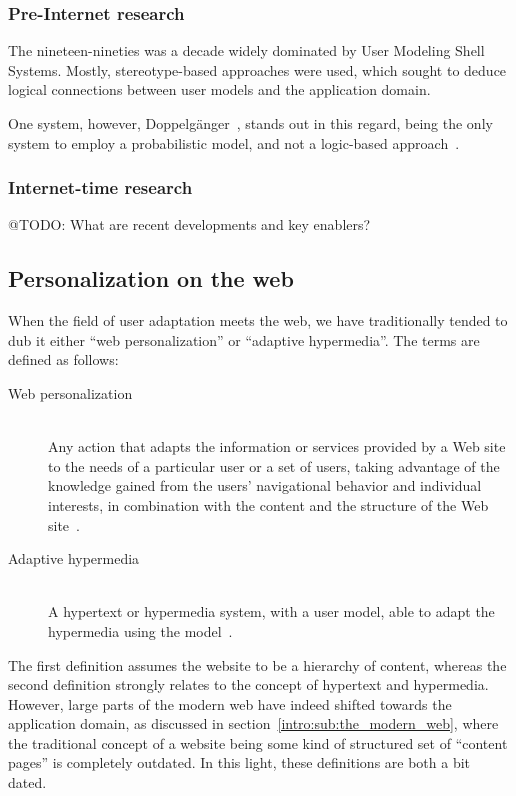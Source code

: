 \subsubsection{Pre-Internet research}

The nineteen-nineties was a decade widely dominated by User Modeling Shell Systems. Mostly, stereotype-based approaches were used, which sought to deduce logical connections between user models and the application domain.

One system, however, Doppelgänger~\cite{Orwant1995}, stands out in this regard, being the only system to employ a probabilistic model, and not a logic-based approach~\cite{Kobsa2001,Pohl1997,Pohl1999}.

\subsubsection{Internet-time research}

@TODO: What are recent developments and key enablers?

\subsection{Personalization on the web}
\label{survey:sub:web_personalization}

When the field of user adaptation meets the web, we have traditionally tended to dub it either ``web personalization'' or ``adaptive hypermedia''. The terms are defined as follows:

\begin{description}
    \item[Web personalization] \hfill \\
      Any action that adapts the information or services provided by a Web site to the needs of a particular user or a set of users, taking advantage of the knowledge gained from the users' navigational behavior and individual interests, in combination with the content and the structure of the Web site~\cite{Eirinaki2003}.
    \item[Adaptive hypermedia] \hfill \\
      A hypertext or hypermedia system, with a user model, able to adapt the hypermedia using the model~\cite{Brusilovsky1996}.
\end{description}

The first definition assumes the website to be a hierarchy of content, whereas the second definition strongly relates to the concept of hypertext and hypermedia. However, large parts of the modern web have indeed shifted towards the application domain, as discussed in section~\ref{intro:sub:the_modern_web}, where the traditional concept of a website being some kind of structured set of ``content pages'' is completely outdated. In this light, these definitions are both a bit dated.

